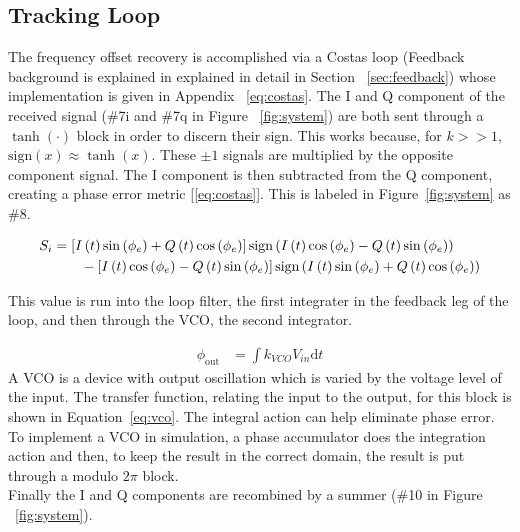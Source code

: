 \documentclass[]{article}
\newcommand{\rom}[1]{\uppercase\expandafter{\romannumeral#1}}
\begin{document}
\subsection{Tracking Loop}
\label{sec:tracking}
The frequency offset  recovery is accomplished via a Costas loop (Feedback background is explained in explained in detail in Section ~\ref{sec:feedback}) whose implementation is given in Appendix ~\ref{eq:costas}. The I and Q component of the received signal (\#7i and \#7q in Figure ~\ref{fig:system}) are both sent through a $\tanh\left(\cdot\right)$ block in order to discern their sign.  This works because, for $k>>1$, $\text{sign}\left(x\right) \approx \tanh \left(x\right)$.  These $\pm1$ signals are multiplied by the opposite component signal.  The I component is then subtracted from the Q component, creating a phase error metric [\ref{eq:costas}].  This is labeled in Figure~\ref{fig:system} as \#8. 

\begin{align}
  \label{eq:costas}
  S_{\rom{1}} &= \left[I\left(t\right)\sin\left(\phi_e\right)+Q\left(t\right)\cos\left(\phi_e\right)\right]\text{sign}\left(I\left(t\right)\cos\left(\phi_e\right)- Q\left(t\right)\sin\left(\phi_e\right)\right)\nonumber \\
  &\qquad {} - \left[I\left(t\right)\cos\left(\phi_e\right)-Q\left(t\right)\sin\left(\phi_e\right)\right]\text{sign}\left(I\left(t\right)\sin\left(\phi_e\right)+Q\left(t\right)\cos\left(\phi_e\right)\right)
  \end{align}

This value is run into the loop filter, the first integrater in the feedback leg of the loop, and then through the VCO, the second integrator.
  
\begin{align}
\label{eq:vco}
\phi_{\text{out}} &= \int \! k_{VCO}V_{in} \mathrm{d}t
\end{align}
A VCO is a device with output oscillation which is varied by the voltage level of the input.  The transfer function, relating the input to the output, for this block is shown in Equation~\ref{eq:vco}. The integral action can help eliminate phase error. To implement a VCO in simulation, a phase accumulator does the integration action and then, to keep the result in the correct domain, the result is put through a modulo $2\pi$ block. \\

Finally the I and Q components are recombined by a summer (\#10 in Figure ~\ref{fig:system}). \\
\end{document}
